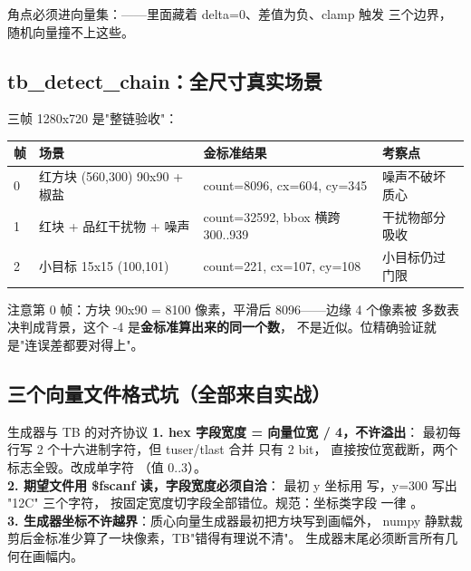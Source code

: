 角点必须进向量集：——里面藏着 delta=0、差值为负、clamp 触发
三个边界，随机向量撞不上这些。

\subsection{tb\_detect\_chain：全尺寸真实场景}

三帧 1280x720 是"整链验收"：

\begin{center}
\begin{tabular}{llll}
\toprule
\rowcolor{rowtint}\textbf{帧} & \textbf{场景} & \textbf{金标准结果} & \textbf{考察点} \\
\midrule
0 & 红方块 (560,300) 90x90 + 椒盐 & count=8096, cx=604, cy=345 & 噪声不破坏质心 \\
1 & 红块 + 品红干扰物 + 噪声 & count=32592, bbox 横跨 300..939 & 干扰物部分吸收 \\
2 & 小目标 15x15 (100,101) & count=221, cx=107, cy=108 & 小目标仍过门限 \\
\bottomrule
\end{tabular}
\end{center}

注意第 0 帧：方块 90x90 = 8100 像素，平滑后 8096——边缘 4 个像素被
多数表决判成背景，这个 -4 是\textbf{金标准算出来的同一个数}，
不是近似。位精确验证就是"连误差都要对得上"。

\subsection{三个向量文件格式坑（全部来自实战）}

\begin{warnbox}{生成器与 TB 的对齐协议}
\textbf{1. hex 字段宽度 = 向量位宽 / 4，不许溢出}：
 最初每行写 2 个十六进制字符，但 tuser/tlast 合并
只有 2 bit， 直接按位宽截断，两个标志全毁。改成单字符
（值 0..3）。\\
\textbf{2. 期望文件用 \$fscanf 读，字段宽度必须自洽}：
 最初 y 坐标用  写，y=300 写出 "12C"
三个字符， 按固定宽度切字段全部错位。规范：坐标类字段
一律 。\\
\textbf{3. 生成器坐标不许越界}：质心向量生成器最初把方块写到画幅外，
numpy 静默裁剪后金标准少算了一块像素，TB"错得有理说不清"。
生成器末尾必须断言所有几何在画幅内。
\end{warnbox}

